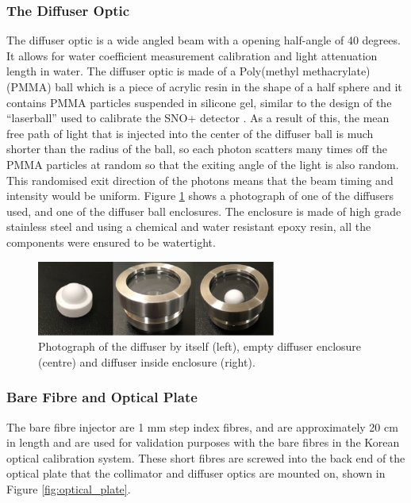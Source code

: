 \subsubsection{The Diffuser Optic}

The diffuser optic is a wide angled beam with a opening half-angle of 40 degrees. It allows for water coefficient measurement calibration and light attenuation length in water. The diffuser optic is made of a Poly(methyl methacrylate) (PMMA) ball which is a piece of acrylic resin in the shape of a half sphere and it contains PMMA particles suspended in silicone gel, similar to the design of the ``laserball'' used to calibrate the SNO+ detector \cite{Moffat_2005}. As a result of this, the mean free path of light that is injected into the center of the diffuser ball is much shorter than the radius of the ball, so each photon scatters many times off the PMMA particles at random so that the exiting angle of the light is also random. This randomised exit direction of the photons means that the beam timing and intensity would be uniform.  
\newline
 Figure \ref{fig:diffuser_photo} shows a photograph of one of the diffusers used, and one of the diffuser ball enclosures. The enclosure is made of high grade stainless steel and using a chemical and water resistant epoxy resin, all the components were ensured to be watertight. 

\begin{figure}
    \centering
    \includegraphics[width=0.7\textwidth]{Figures/diffuser_photo.png}
    \caption{Photograph of the diffuser by itself (left), empty diffuser enclosure (centre) and diffuser inside enclosure (right).}
    \label{fig:diffuser_photo}
\end{figure} 

\subsubsection{Bare Fibre and Optical Plate}

The bare fibre injector are 1 mm step index fibres, and are approximately 20 cm in length and are used for validation purposes with the bare fibres in the Korean optical calibration system. These short fibres are screwed into the back end of the optical plate that the collimator and diffuser optics are mounted on, shown in Figure \ref{fig:optical_plate}.


